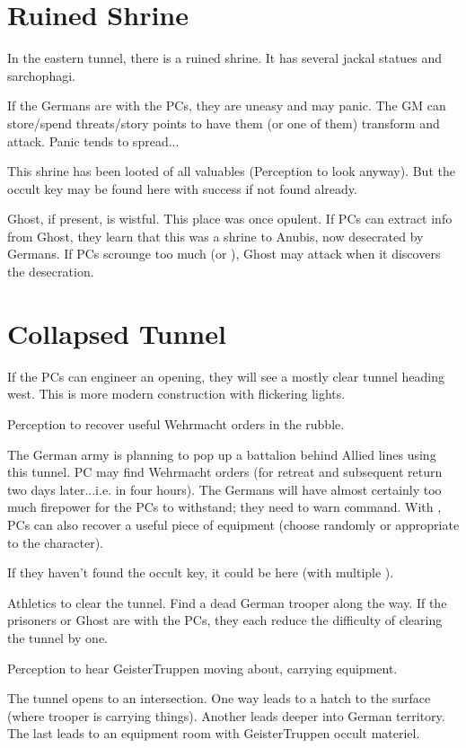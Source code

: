 \documentclass{book}
\newcommand{\df}{\DifficultyDie }
\newcommand{\stb}{\SetbackDie }
\newcommand{\ch}{\ChallengeDie }
\begin{document}
\begin{multicols}{2}
\section{Ruined Shrine}

In the eastern tunnel, there is a ruined shrine.  It has several jackal statues and sarchophagi.

If the Germans are with the PCs, they are uneasy and may panic.  The GM can store/spend threats/story points to have them (or one of them) transform and attack.  Panic tends to spread...

This shrine has been looted of all valuables (\ch\df\stb\stb Perception to look anyway).  But the occult key may be found here with success if not found already.

Ghost, if present, is wistful.  This place was once opulent.  If PCs can extract info from Ghost, they learn that this was a shrine to Anubis, now desecrated by Germans.  If PCs scrounge too much (\Threat\Threat\Threat or \Despair), Ghost may attack when it discovers the desecration.

\section{Collapsed Tunnel}

If the PCs can engineer an opening, they will see a mostly clear tunnel heading west.  This is more modern construction with flickering lights.

\df\df Perception to recover useful Wehrmacht orders in the rubble.

The German army is planning to pop up a battalion behind Allied lines using this tunnel.  PC may find Wehrmacht orders (for retreat and subsequent return two days later...i.e. in four hours).  The Germans will have almost certainly too much firepower for the PCs to withstand; they need to warn command.  With \Advantage\Advantage, PCs can also recover a useful piece of equipment (choose randomly or appropriate to the character).

If they haven't found the occult key, it could be here (with multiple \Advantage).

\df\df\df Athletics to clear the tunnel.  Find a dead German trooper along the way.  
If the prisoners or Ghost are with the PCs, they each reduce the difficulty of clearing the tunnel by one.

\df\df Perception to hear GeisterTruppen moving about, carrying equipment.

The tunnel opens to an intersection.  One way leads to a hatch to the surface (where trooper is carrying things).  Another leads deeper into German territory.  The last leads to an equipment room with GeisterTruppen occult materiel.


\end{multicols}
\end{document}
